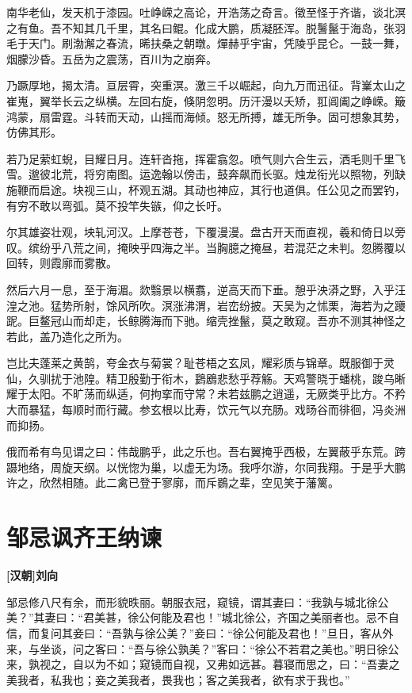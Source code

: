 \documentclass[UTF8,titlepage,oneside]{ctexbook}
\begin{document}
南华老仙，发天机于漆园。吐峥嵘之高论，开浩荡之奇言。徵至怪于齐谐，谈北溟之有鱼。吾不知其几千里，其名曰鲲。化成大鹏，质凝胚浑。脱鬐鬣于海岛，张羽毛于天门。刷渤澥之春流，晞扶桑之朝暾。燀赫乎宇宙，凭陵乎昆仑。一鼓一舞，烟朦沙昏。五岳为之震荡，百川为之崩奔。

乃蹶厚地，揭太清。亘层霄，突重溟。激三千以崛起，向九万而迅征。背嶪太山之崔嵬，翼举长云之纵横。左回右旋，倏阴忽明。历汗漫以夭矫，羾阊阖之峥嵘。簸鸿蒙，扇雷霆。斗转而天动，山摇而海倾。怒无所搏，雄无所争。固可想象其势，仿佛其形。

若乃足萦虹蜺，目耀日月。连轩沓拖，挥霍翕忽。喷气则六合生云，洒毛则千里飞雪。邈彼北荒，将穷南图。运逸翰以傍击，鼓奔飙而长驱。烛龙衔光以照物，列缺施鞭而启途。块视三山，杯观五湖。其动也神应，其行也道俱。任公见之而罢钓，有穷不敢以弯弧。莫不投竿失镞，仰之长吁。

尔其雄姿壮观，坱轧河汉。上摩苍苍，下覆漫漫。盘古开天而直视，羲和倚日以旁叹。缤纷乎八荒之间，掩映乎四海之半。当胸臆之掩昼，若混茫之未判。忽腾覆以回转，则霞廓而雾散。

然后六月一息，至于海湄。欻翳景以横翥，逆高天而下垂。憩乎泱漭之野，入乎汪湟之池。猛势所射，馀风所吹。溟涨沸渭，岩峦纷披。天吴为之怵栗，海若为之躨跜。巨鳌冠山而却走，长鲸腾海而下驰。缩壳挫鬣，莫之敢窥。吾亦不测其神怪之若此，盖乃造化之所为。

岂比夫蓬莱之黄鹄，夸金衣与菊裳？耻苍梧之玄凤，耀彩质与锦章。既服御于灵仙，久驯扰于池隍。精卫殷勤于衔木，鶢鶋悲愁乎荐觞。天鸡警晓于蟠桃，踆乌晰耀于太阳。不旷荡而纵适，何拘挛而守常？未若兹鹏之逍遥，无厥类乎比方。不矜大而暴猛，每顺时而行藏。参玄根以比寿，饮元气以充肠。戏旸谷而徘徊，冯炎洲而抑扬。

俄而希有鸟见谓之曰：伟哉鹏乎，此之乐也。吾右翼掩乎西极，左翼蔽乎东荒。跨蹑地络，周旋天纲。以恍惚为巢，以虚无为场。我呼尔游，尔同我翔。于是乎大鹏许之，欣然相随。此二禽已登于寥廓，而斥鷃之辈，空见笑于藩篱。


\chapter*{邹忌讽齐王纳谏}
\begin{center}
	\textbf{[汉朝]刘向}
\end{center}


邹忌修八尺有余，而形貌昳丽。朝服衣冠，窥镜，谓其妻曰：“我孰与城北徐公美？”其妻曰：“君美甚，徐公何能及君也！”城北徐公，齐国之美丽者也。忌不自信，而复问其妾曰：“吾孰与徐公美？”妾曰：“徐公何能及君也！”旦日，客从外来，与坐谈，问之客曰：“吾与徐公孰美？”客曰：“徐公不若君之美也。”明日徐公来，孰视之，自以为不如；窥镜而自视，又弗如远甚。暮寝而思之，曰：“吾妻之美我者，私我也；妾之美我者，畏我也；客之美我者，欲有求于我也。”
\end{document}
